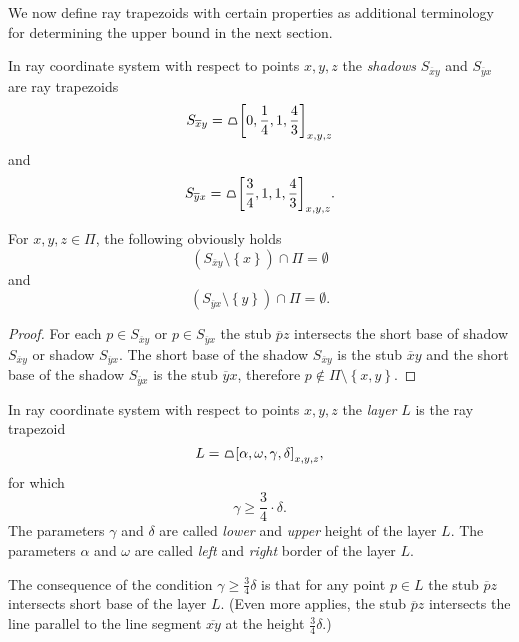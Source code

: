We now define ray trapezoids with certain properties as additional terminology for determining the upper bound in the next section.

\begin{definition}[Shadows]
In ray coordinate system with respect to points $x,y,z$ the \textit{shadows} $S_{\overline{x}y}$ and $S_{\overline{y}x}$ are ray trapezoids
$$
S_{\overline{x}y} = \tpz{\left[ 0,\frac{1}{4},1,\frac{4}{3} \right]_{x,y,z} }
$$
and
$$
S_{\overline{y}x} = \tpz{\left[ \frac{3}{4},1,1,\frac{4}{3} \right]_{x,y,z} }.
$$
\end{definition}

\begin{proposition}
For $x,y,z \in \Pi$, the following obviously holds
\begin{equation}
\left( S_{\overline{x}y} \setminus \left\{ x \right\} \right) \cap \Pi = \emptyset
\end{equation}
and
\begin{equation}
\left( S_{\overline{y}x} \setminus \left\{ y \right\} \right) \cap \Pi = \emptyset.
\end{equation}
\end{proposition}

\begin{proof}
For each  $p \in S_{\overline{x}y}$ or $p \in S_{\overline{y}x}$ the stub $\overline{p}z$ intersects the short base of shadow $S_{\overline{x}y}$ or shadow $S_{\overline{y}x}$. The short base of the shadow $S_{\overline{x}y}$ is the stub $\overline{x}y$ and the short base of the shadow $S_{\overline{y}x}$ is the stub $\overline{y}x$, therefore $p \notin \Pi\setminus \left\{ x,y \right\}$.
\end{proof}

\begin{definition}[Layer]
In ray coordinate system with respect to points $x,y,z$ the \textit{layer} $L$ is the ray trapezoid
$$L = \tpz{\left[ \alpha,\omega,\gamma,\delta \right]_{x,y,z} },$$
for which
$$
\gamma \geq \frac{3}{4} \cdot \delta.
$$
The parameters $\gamma$ and $\delta$ are called \textit{lower} and \textit{upper} height of the layer $L$. The parameters $\alpha$ and $\omega$ are called \textit{left} and \textit{right} border of the layer $L$.
\end{definition}

The consequence of the condition $\gamma \geq \frac{3}{4}\delta$ is that for any point $p \in L$ the stub $\overline{p}z$ intersects short base of the layer $L$. (Even more applies, the stub $\overline{p}z$ intersects the line parallel to the line segment $\overline{xy}$ at the height $\frac{3}{4}\delta$.)


